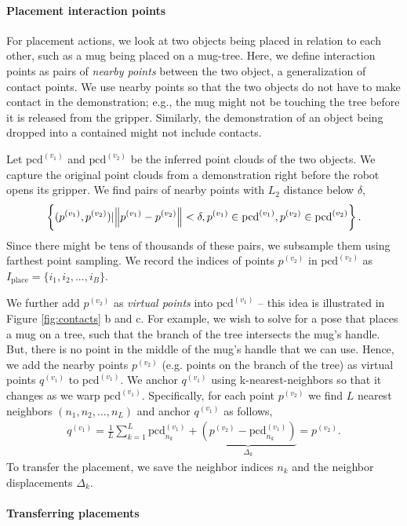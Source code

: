 \documentclass{article}
\newcommand{\pcx}[1]{\mathrm{pcd}^{(#1)}}
\begin{document}
\paragraph{Placement interaction points} For placement actions, we look at two objects being placed in relation to each other, such as a mug being placed on a mug-tree. Here, we define interaction points as pairs of \textit{nearby points} between the two object, a generalization of contact points. We use nearby points so that the two objects do not have to make contact in the demonstration; e.g., the mug might not be touching the tree before it is released from the gripper. Similarly, the demonstration of an object being dropped into a contained might not include contacts.

Let $\pcx{v_1}$ and $\pcx{v_2}$ be the inferred point clouds of the two objects. We capture the original point clouds from a demonstration right before the robot opens its gripper. We find pairs of nearby points with $L_2$ distance below $\delta$,
\begin{align}
    \left\{ (p^{(v_1)}, p^{(v_2)}) | \norm{p^{(v_1)} - p^{(v_2)}} < \delta, p^{(v_1)} \in \pcx{v_1}, p^{(v_2)} \in \pcx{v_2} \right\}.
\end{align}
Since there might be tens of thousands of these pairs, we subsample them using farthest point sampling. We record the indices of points $p^{(v_2)}$ in $\pcx{v_2}$ as $I_{\mathrm{place}} = \{ i_1, i_2, ..., i_B \}$.

We further add $p^{(v_2)}$ as \textit{virtual points} into $\pcx{v_1}$ -- this idea is illustrated in Figure \ref{fig:contacts} b and c. For example, we wish to solve for a pose that places a mug on a tree, such that the branch of the tree intersects the mug's handle. But, there is no point in the middle of the mug's handle that we can use. Hence, we add the nearby points $p^{(v_2)}$ (e.g. points on the branch of the tree) as virtual points $q^{(v_1)}$ to $\pcx{v_1}$. We anchor $q^{(v_1)}$ using k-nearest-neighbors so that it changes as we warp $\pcx{v_1}$. Specifically, for each point $p^{(v_2)}$ we find $L$ nearest neighbors $(n_1, n_2, ..., n_L)$ and anchor $q^{(v_1)}$ as follows,
\begin{align}
    q^{(v_1)} = \frac{1}{L} \sum_{k=1}^L \pcx{v_1}_{n_k} + \underbrace{(p^{(v_2)} - \pcx{v_1}_{n_k})}_{\Delta_k} = p^{(v_2)}.
\end{align}
To transfer the placement, we save the neighbor indices $n_k$ and the neighbor displacements $\Delta_k$.

\paragraph{Transferring placements} 
\end{document}
